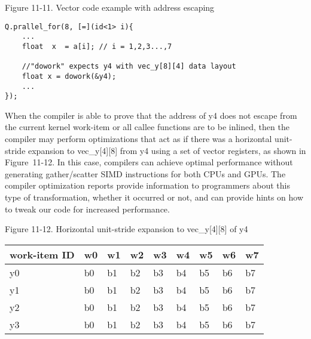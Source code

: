\hspace*{\fill} \par %
Figure 11-11. Vector code example with address escaping
\begin{lstlisting}[caption={}]
Q.prallel_for(8, [=](id<1> i){
	...
	float  x  = a[i]; // i = 1,2,3...,7

	//"dowork" expects y4 with vec_y[8][4] data layout
	float x = dowork(&y4);
	...
});
\end{lstlisting}

When the compiler is able to prove that the address of y4 does not escape from the current kernel work-item or all callee functions are to be inlined, then the compiler may perform optimizations that act as if there was a horizontal unit-stride expansion to vec\_y[4][8] from y4 using a set of vector registers, as shown in Figure 11-12. In this case, compilers can achieve optimal performance without generating gather/scatter SIMD instructions for both CPUs and GPUs. The compiler optimization reports provide information to programmers about this type of transformation, whether it occurred or not, and can provide hints on how to tweak our code for increased performance.\par

\hspace*{\fill} \par %
Figure 11-12. Horizontal unit-stride expansion to vec\_y[4][8] of y4
\begin{table}[H]
	\begin{tabular}{|l|l|l|l|l|l|l|l|l|}
		\hline
		work-item ID & w0 & w1 & w2 & w3 & w4 & w5 & w6 & w7 \\ \hline
		y0           & b0 & b1 & b2 & b3 & b4 & b5 & b6 & b7 \\ \hline
		y1           & b0 & b1 & b2 & b3 & b4 & b5 & b6 & b7 \\ \hline
		y2           & b0 & b1 & b2 & b3 & b4 & b5 & b6 & b7 \\ \hline
		y3           & b0 & b1 & b2 & b3 & b4 & b5 & b6 & b7 \\ \hline
	\end{tabular}
\end{table}















